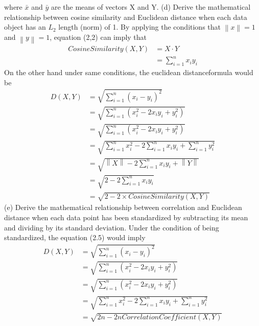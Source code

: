 \documentclass[paper=a4, fontsize=11pt]{scrartcl} %
\numberwithin{equation}{section} %
\numberwithin{figure}{section} %
\numberwithin{table}{section} %
\newcommand{\norm}[1]{\left\lVert#1\right\rVert}
\begin{document}
where $\bar{x}$ and $\bar{y}$ are the means of vectors X and Y. 
\newline
\newline
(d) Derive the mathematical relationship between cosine similarity and Euclidean distance when each data
object has an $L_2$ length (norm) of 1.
\newline
\newline
By applying the conditions that $\norm{x}=1$ and $\norm{y}=1$, equation (2,2) can imply that
\begin{align}
CosineSimilarity(X,Y) &= X\cdot Y \\
&= \sum\limits_{i=1}^n x_i y_i
\end{align}
On the other hand under same conditions, the euclidean distanceformula would be
\begin{align}
D(X,Y) &= \sqrt{\sum\limits_{i=1}^n (x_i - y_i)^2} \\
&= \sqrt{\sum\limits_{i=1}^n (x_i^2 -2x_iy_i+ y_i^2) }\\
&= \sqrt{\sum\limits_{i=1}^n (x_i^2 -2x_iy_i+ y_i^2)} \\
&=  \sqrt{\sum\limits_{i=1}^n x_i^2 -2\sum\limits_{i=1}^n x_iy_i+ \sum\limits_{i=1}^n y_i^2} \\
&=  \sqrt{\norm{X} -2\sum\limits_{i=1}^n x_iy_i+ \norm{Y}} \\
&=  \sqrt{2-2\sum\limits_{i=1}^n x_iy_i} \\
&= \sqrt{2-2\times CosineSimilarity(X,Y)}
\end{align}
\newline
\newline
(e) Derive the mathematical relationship between correlation and Euclidean distance when each data point has been standardized by subtracting its mean and dividing by its standard deviation.
\newline
\newline
Under the condition of being standardized, the equation (2.5) would imply
\begin{align}
D(X,Y) &= \sqrt{\sum\limits_{i=1}^n (x_i - y_i)^2} \\
&= \sqrt{\sum\limits_{i=1}^n (x_i^2 -2x_iy_i+ y_i^2) }\\
&= \sqrt{\sum\limits_{i=1}^n (x_i^2 -2x_iy_i+ y_i^2)} \\
&=  \sqrt{\sum\limits_{i=1}^n x_i^2 -2\sum\limits_{i=1}^n x_iy_i+ \sum\limits_{i=1}^n y_i^2} \\
&=  \sqrt{2n -2nCorrelationCoefficient(X,Y)} 
\end{align}
\end{document}
